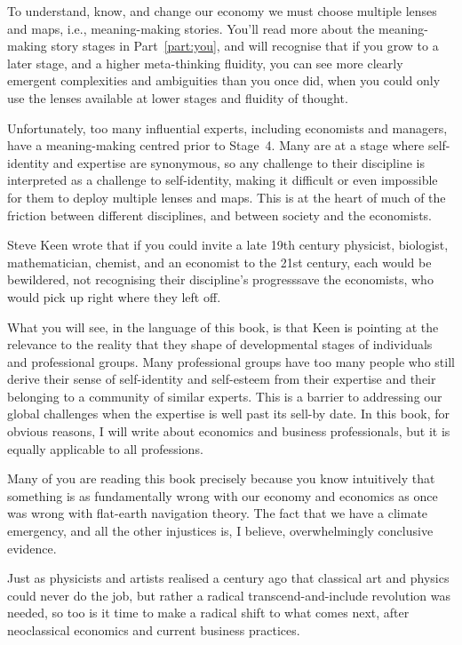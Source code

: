 To understand, know, and change our economy we must choose multiple lenses and maps, i.e., meaning\hyp{}making stories. You'll read more about the meaning\hyp{}making story stages in Part~\ref{part:you}, and will recognise that if you grow to a later stage, and a higher meta-thinking fluidity, you can see more clearly emergent complexities and ambiguities than you once did, when you could only use the lenses available at lower stages and fluidity of thought. 


Unfortunately, too many influential experts, including economists and managers, have a meaning\hyp{}making centred prior to Stage~4. Many are at a stage where self-identity and expertise are synonymous, so any challenge to their discipline is interpreted as a challenge to self-identity, making it difficult or even impossible for them to deploy multiple lenses and maps. This is at the heart of much of the friction between different disciplines, and between society and the economists. 


Steve Keen\cite{keen-debunking} wrote that if you could invite a late 19th century physicist, biologist, mathematician, chemist, and an economist to the 21st century, each would be bewildered, not recognising their discipline’s progress\textemdash save the economists, who would pick up right where they left off. 


What you will see, in the language of this book, is that Keen is pointing at the relevance  to the reality that they shape of developmental stages of individuals and professional groups. Many professional groups have too many people who still derive their sense of self-identity and self-esteem from their expertise and their belonging to a community of similar experts. This is a barrier to addressing our global challenges when the expertise is well past its sell-by date. In this book, for obvious reasons, I will write about economics and business professionals, but it is equally applicable to all professions. 


Many of you are reading this book precisely because you know intuitively that something is as fundamentally wrong with our economy and economics as once was wrong with flat-earth navigation theory. The fact that we have a climate emergency, and all the other injustices is, I believe, overwhelmingly conclusive evidence. 


Just as physicists and artists realised a century ago that classical art and physics could never do the job, but rather a radical transcend-and-include revolution was needed, so too is it time to make a radical shift to what comes next, after neoclassical economics and current business practices.


